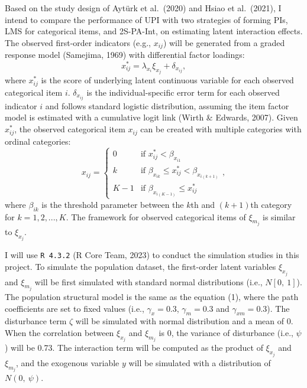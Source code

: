 \documentclass[
  man]{apa7}
\begin{document}
Based on the study design of Aytürk et al.~(2020) and Hsiao et al.~(2021), I intend to compare the performance of UPI with two strategies of forming PIs, LMS for categorical items, and 2S-PA-Int, on estimating latent interaction effects. The observed first-order indicators (e.g., \(x_{ij}\)) will be generated from a graded response model (Samejima, 1969) with differential factor loadings:
\begin{equation}
x_{ij}^* = \lambda_{x_{i}}\xi_{x_{j}} + \delta_{x_{ij}},
\end{equation}
where \(x_{ij}^*\) is the score of underlying latent continuous variable for each observed categorical item \(i\). \(\delta_{x_{ij}}\) is the individual-specific error term for each observed indicator \(i\) and follows standard logistic distribution, assuming the item factor model is estimated with a cumulative logit link (Wirth \& Edwards, 2007). Given \(x_{ij}^*\), the observed categorical item \(x_{ij}\) can be created with multiple categories with ordinal categories:
\begin{equation}
  x_{ij} =
    \begin{cases}
      0 & \text{if $x_{ij}^* < \beta_{x_{i1}}$}\\
      k & \text{if $\beta_{x_{ik}} \le x_{ij}^* < \beta_{x_{i(k + 1)}}$}\\
      K - 1 & \text{if $\beta_{x_{i(K - 1)}} \le x_{ij}^*$}
    \end{cases},      
\end{equation}
where \(\beta_{ik}\) is the threshold parameter between the \(k\)th and \((k + 1)\)th category for \(k = 1, 2,...,K\). The framework for observed categorical items of \(\xi_{m_{j}}\) is similar to \(\xi_{x_{j}}\).

I will use \texttt{R\ 4.3.2} (R Core Team, 2023) to conduct the simulation studies in this project. To simulate the population dataset, the first-order latent variables \(\xi_{x_{j}}\) and \(\xi_{m_{j}}\) will be first simulated with standard normal distributions (i.e., \(N[0, \ 1]\)). The population structural model is the same as the equation (1), where the path coefficients are set to fixed values (i.e., \(\gamma_{x} = 0.3\), \(\gamma_{m} = 0.3\) and \(\gamma_{xm} = 0.3\)). The disturbance term \(\zeta\) will be simulated with normal distribution and a mean of 0. When the correlation between \(\xi_{x_{j}}\) and \(\xi_{m_{j}}\) is 0, the variance of disturbance (i.e., \(\psi\)) will be 0.73. The interaction term will be computed as the product of \(\xi_{x_{j}}\) and \(\xi_{m_{j}}\), and the exogenous variable \(y\) will be simulated with a distribution of \(N(0, \ \psi)\).
\end{document}
